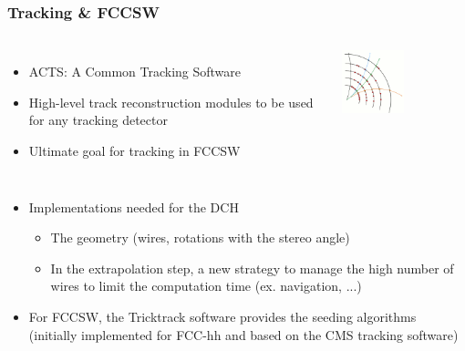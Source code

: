 \documentclass[aspectratio=169, hyperref={colorlinks=true,pdfpagelabels=false,linkcolor=black}, xcolor=dvipsnames,10pt]{beamer}
\begin{document}
\begin{frame}
  \frametitle{Tracking \& FCCSW}

  \begin{columns}
    \begin{itemize}
      \item ACTS: A Common Tracking Software
      \item High-level track reconstruction modules to be used for any tracking detector
      \item Ultimate goal for tracking in FCCSW
    \end{itemize}

    \centering
    \includegraphics[width=0.5\textwidth]{Figures/ACTSlogo.png}
  \end{columns}

  \begin{itemize}
    \item Implementations needed for the DCH
      \begin{itemize}
        \item The geometry (wires, rotations with the stereo angle)
        \item In the extrapolation step, a new strategy to manage the high number of wires to limit the computation time (ex. navigation, ...)
      \end{itemize}
    \item For FCCSW, the Tricktrack software provides the seeding algorithms (initially implemented for FCC-hh and based on the CMS tracking software)
  \end{itemize}

\end{frame}
\end{document}
